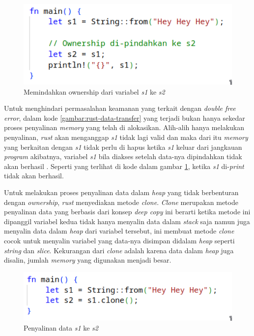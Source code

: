 \begin{figure}[H]
  \centering
	\includegraphics[keepaspectratio, width=12cm]{gambar/ownership-transfer.png}
  \caption{Memindahkan ownership dari variabel \emph{s1} ke \emph{s2} \citep{rustbook}}
	\label{gambar:rust-ownership-transfer}
\end{figure}

Untuk menghindari permasalahan keamanan yang terkait dengan \emph{double free error}, dalam kode \ref{gambar:rust-data-transfer} yang terjadi bukan hanya sekedar proses penyalinan \emph{memory} yang telah di alokasikan. Alih-alih hanya melakukan penyalinan, \emph{rust} akan menganggap \emph{s1} tidak lagi valid dan maka dari itu \emph{memory} yang berkaitan dengan \emph{s1} tidak perlu di hapus ketika \emph{s1} keluar dari jangkauan \emph{program} akibatnya, variabel \emph{s1} bila diakses setelah data-nya dipindahkan tidak akan berhasil \citep{rustbook}. Seperti yang terlihat di kode dalam gambar \ref{gambar:rust-ownership-transfer}, ketika \emph{s1} di-\emph{print} tidak akan berhasil.

Untuk melakukan proses penyalinan data dalam \emph{heap} yang tidak berbenturan dengan \emph{ownership}, \emph{rust} menyediakan metode \emph{clone}. \emph{Clone} merupakan metode penyalinan data yang berbasis dari konsep \emph{deep copy} ini berarti ketika metode ini dipanggil variabel kedua tidak hanya menyalin data dalam \emph{stack} saja namun juga menyalin data dalam \emph{heap} dari variabel tersebut, ini membuat metode \emph{clone} cocok untuk menyalin variabel yang data-nya disimpan didalam \emph{heap} seperti \emph{string} dan \emph{slice}. Kekurangan dari \emph{clone} adalah karena data dalam \emph{heap} juga disalin, jumlah \emph{memory} yang digunakan menjadi besar.\citep{rustbook}

\begin{figure}[H]
  \centering
	\includegraphics[keepaspectratio, width=12cm]{gambar/rust-clone-method.png}
  \caption{Penyalinan data \emph{s1} ke \emph{s2} \citep{rustbook}}
	\label{gambar:rust-clone-method}
\end{figure}

